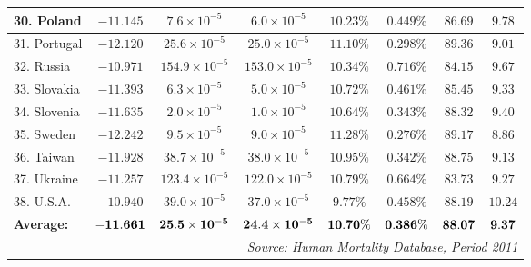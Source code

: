 \documentclass[12pt, titlepage]{article}%
\begin{document}
\begin{table}
\begin{center}
\begin{tabular}{||l|c|c|c|c|c|c|c||}
30. Poland &  $-11.145$ & $7.6\times10^{-5}$ & $6.0\times10^{-5}$ & $10.23\%$ & $0.449\%$ & $86.69$ & $9.78$\\ \hline
31. Portugal &  $-12.120$ & $25.6\times10^{-5}$ & $25.0\times10^{-5}$ & $11.10\%$ & $0.298\%$ & $89.36$ & $9.01$\\ \hline
32. Russia &  $-10.971$ & $154.9\times10^{-5}$ & $153.0\times10^{-5}$ & $10.34\%$ & $0.716\%$ & $84.15$ & $9.67$\\ \hline
33. Slovakia &  $-11.393$ & $6.3\times10^{-5}$ & $5.0\times10^{-5}$ & $10.72\%$ & $0.461\%$ & $85.45$ & $9.33$\\ \hline
34. Slovenia &  $-11.635$ & $2.0\times10^{-5}$ & $1.0\times10^{-5}$ & $10.64\%$ & $0.343\%$ & $88.32$ & $9.40$\\ \hline
35. Sweden &  $-12.242$ & $9.5\times10^{-5}$ & $9.0\times10^{-5}$ & $11.28\%$ & $0.276\%$ & $89.17$ & $8.86$\\ \hline
36. Taiwan &  $-11.928$ & $38.7\times10^{-5}$ & $38.0\times10^{-5}$ & $10.95\%$ & $0.342\%$ & $88.75$ & $9.13$\\ \hline
37. Ukraine &  $-11.257$ & $123.4\times10^{-5}$ & $122.0\times10^{-5}$ & $10.79\%$ & $0.664\%$ & $83.73$ & $9.27$\\ \hline
38. U.S.A. &  $-10.940$ & $39.0\times10^{-5}$ & $37.0\times10^{-5}$ & $9.77\%$ & $0.458\%$ & $88.19$ & $10.24$\\ \hline
{\bf Average:} & $\bf -11.661$ & $\bf 25.5\times10^{-5}$ & $\bf 24.4\times10^{-5}$ & $\bf 10.70\%$ & $\bf 0.386\%$ & $\bf 88.07$ & $\bf 9.37$\\ \hline
\hline
\multicolumn{8}{||r||}{{\em Source: Human Mortality Database, Period 2011}} \\ \hline\hline
\end{tabular}
\label{lab2}
\smallskip
\end{center}
\end{table}
\end{document}

